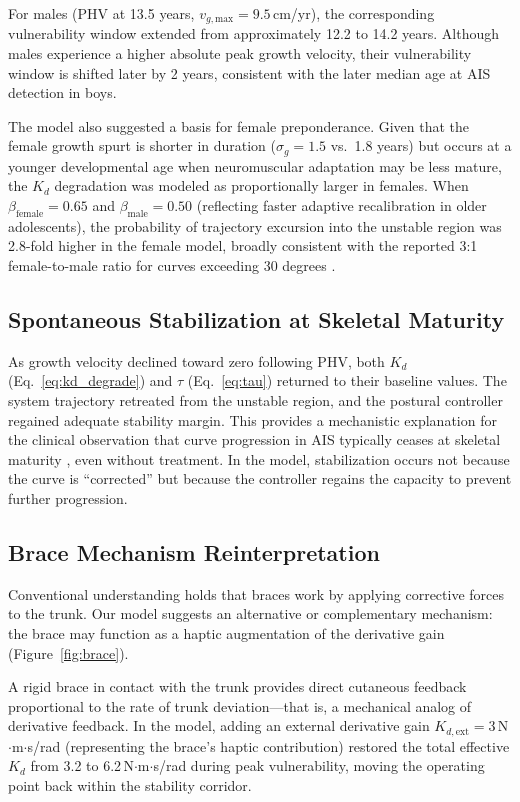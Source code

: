 \documentclass[12pt,a4paper]{article}
\begin{document}
For males (PHV at 13.5 years, $v_{g,\text{max}} = 9.5$\,cm/yr), the corresponding vulnerability window extended from approximately 12.2 to 14.2 years. Although males experience a higher absolute peak growth velocity, their vulnerability window is shifted later by 2 years, consistent with the later median age at AIS detection in boys.

The model also suggested a basis for female preponderance. Given that the female growth spurt is shorter in duration ($\sigma_g = 1.5$ vs.\ 1.8 years) but occurs at a younger developmental age when neuromuscular adaptation may be less mature, the $K_d$ degradation was modeled as proportionally larger in females. When $\beta_{\text{female}} = 0.65$ and $\beta_{\text{male}} = 0.50$ (reflecting faster adaptive recalibration in older adolescents), the probability of trajectory excursion into the unstable region was 2.8-fold higher in the female model, broadly consistent with the reported 3:1 female-to-male ratio for curves exceeding 30 degrees \citep{cheng2015prevalence}.

\subsection{Spontaneous Stabilization at Skeletal Maturity}

As growth velocity declined toward zero following PHV, both $K_d$ (Eq.~\ref{eq:kd_degrade}) and $\tau$ (Eq.~\ref{eq:tau}) returned to their baseline values. The system trajectory retreated from the unstable region, and the postural controller regained adequate stability margin. This provides a mechanistic explanation for the clinical observation that curve progression in AIS typically ceases at skeletal maturity \citep{weinstein2008natural}, even without treatment. In the model, stabilization occurs not because the curve is ``corrected'' but because the controller regains the capacity to prevent further progression.

\subsection{Brace Mechanism Reinterpretation}

Conventional understanding holds that braces work by applying corrective forces to the trunk. Our model suggests an alternative or complementary mechanism: the brace may function as a haptic augmentation of the derivative gain (Figure~\ref{fig:brace}).

A rigid brace in contact with the trunk provides direct cutaneous feedback proportional to the rate of trunk deviation---that is, a mechanical analog of derivative feedback. In the model, adding an external derivative gain $K_{d,\text{ext}} = 3$\,N$\cdot$m$\cdot$s/rad (representing the brace's haptic contribution) restored the total effective $K_d$ from 3.2 to 6.2\,N$\cdot$m$\cdot$s/rad during peak vulnerability, moving the operating point back within the stability corridor.
\end{document}
